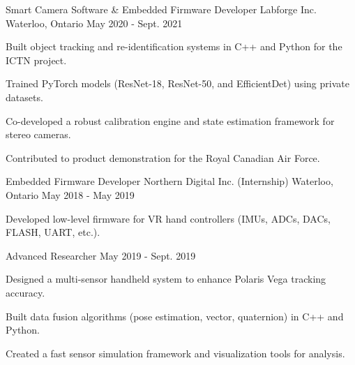 \begin{cventries}
  \cventry
    {Smart Camera Software \& Embedded Firmware Developer} %
    {Labforge Inc.} %
    {Waterloo, Ontario} %
    {May 2020 - Sept. 2021} %
    {
      \begin{cvitems} %
        \item {Built object tracking and re-identification systems in C++ and Python for the ICTN project.}
        \item {Trained PyTorch models (ResNet-18, ResNet-50, and EfficientDet) using private datasets.}
        \item {Co-developed a robust calibration engine and state estimation framework for stereo cameras.}
        \item {Contributed to product demonstration for the Royal Canadian Air Force.}
      \end{cvitems}
    }

  \cventry
    {Embedded Firmware Developer } %
    {Northern Digital Inc. (Internship)} %
    {Waterloo, Ontario} %
    {May 2018 - May 2019} %
    {
      \begin{cvitems} %
        \item {Developed low-level firmware for VR hand controllers (IMUs, ADCs, DACs, FLASH, UART, etc.).}
      \end{cvitems}
    }

  \cventry
    {Advanced Researcher } %
    {} %
    {} %
    {May 2019 - Sept. 2019} %
    {
      \begin{cvitems} %
        \item {Designed a multi-sensor handheld system to enhance Polaris Vega tracking accuracy.}
        \item {Built data fusion algorithms (pose estimation, vector, quaternion) in C++ and Python.}
        \item {Created a fast sensor simulation framework and visualization tools for analysis.}
      \end{cvitems}
    }


\end{cventries}
